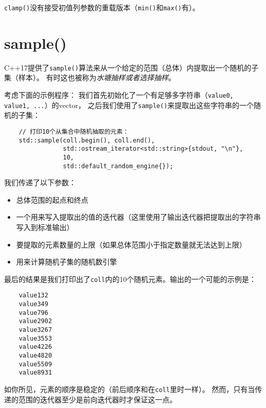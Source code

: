 \texttt{clamp()}没有接受初值列参数的重载版本（\texttt{min()}和\texttt{max()}有）。


\section{sample()}\label{ch25.4}
C++17提供了\texttt{sample()}算法来从一个给定的范围（总体）内提取出一个随机的子集（样本）。
有时这也被称为\emph{水塘抽样或者选择抽样}。

考虑下面的示例程序：
我们首先初始化了一个有足够多字符串（\texttt{value0, value1, ...}）的vector，
之后我们使用了\texttt{sample()}来提取出这些字符串的一个随机的子集：
\begin{lstlisting}
    // 打印10个从集合中随机抽取的元素：
    std::sample(coll.begin(), coll.end(),
                std::ostream_iterator<std::string>{stdout, "\n"},
                10,
                std::default_random_engine{});
\end{lstlisting}
我们传递了以下参数：
\begin{itemize}
    \item 总体范围的起点和终点
    \item 一个用来写入提取出的值的迭代器（这里使用了输出迭代器把提取出的字符串写入到标准输出）
    \item 要提取的元素数量的上限（如果总体范围小于指定数量就无法达到上限）
    \item 用来计算随机子集的随机数引擎
\end{itemize}
最后的结果是我们打印出了\texttt{coll}内的10个随机元素。输出的一个可能的示例是：
\begin{lstlisting}
    value132
    value349
    value796
    value2902
    value3267
    value3553
    value4226
    value4820
    value5509
    value8931
\end{lstlisting}
如你所见，元素的顺序是稳定的（前后顺序和在\texttt{coll}里时一样）。
然而，只有当传递的范围的迭代器至少是前向迭代器时才保证这一点。

